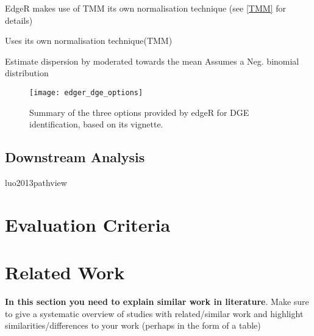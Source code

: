 EdgeR makes use of \ac{TMM} its own normalisation technique (see \autoref{TMM} for details) 




Uses its own normalisation technique(TMM)

Estimate dispersion by moderated towards the mean
Assumes a Neg. binomial distribution

\begin{figure}[!ht]
    \centering
    \texttt{[image: edger\_dge\_options]}
    \caption[Summary of the options provided by edgeR for DGE identification]{Summary of the three options provided by edgeR for \ac{DGE} identification, based on its vignette. } 
    \label{fig:edger_options}
\end{figure}
\clearpage

\subsection{Downstream Analysis}

luo2013pathview

\section{Evaluation Criteria}

\section{Related Work}
\textbf{In this section you need to explain similar work in literature}.  Make sure to give a systematic overview of studies with related/similar work and highlight similarities/differences to your work (perhaps in the form of a table)


